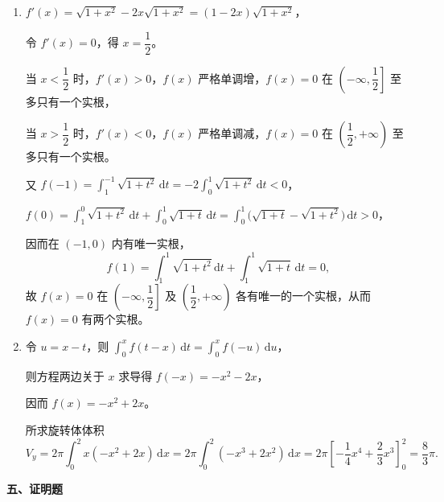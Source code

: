 \documentclass[a4paper,11pt]{ctexart}
\newcommand{\dd}{\,\mathrm{d}}
\begin{document}
\begin{enumerate}[label=\arabic*., start=17, leftmargin=2em, itemsep=0.9em, topsep=0.5em]
  \item $f'(x)=\sqrt{1+x^2}-2x\sqrt{1+x^2}=(1-2x)\sqrt{1+x^2}$，

  令 $f'(x)=0$，得 $x=\dfrac{1}{2}$。

  当 $x<\dfrac{1}{2}$ 时，$f'(x)>0$，$f(x)$ 严格单调增，$f(x)=0$ 在 $\left(-\infty,\dfrac{1}{2}\right]$ 至多只有一个实根，

  当 $x>\dfrac{1}{2}$ 时，$f'(x)<0$，$f(x)$ 严格单调减，$f(x)=0$ 在 $\left(\dfrac{1}{2},+\infty\right)$ 至多只有一个实根。

  又 $f(-1)=\displaystyle\int_1^{-1}\sqrt{1+t^2}\dd t=-2\int_0^1\sqrt{1+t^2}\dd t<0$，

  $f(0)=\displaystyle\int_1^0\sqrt{1+t^2}\dd t+\int_0^1\sqrt{1+t}\dd t=\int_0^1\bigl(\sqrt{1+t}-\sqrt{1+t^2}\bigr)\dd t>0$，

  因而在 $(-1,0)$ 内有唯一实根，
  \[
    f(1)=\int_1^1\sqrt{1+t^2}\dd t+\int_1^1\sqrt{1+t}\dd t=0,
  \]
  故 $f(x)=0$ 在 $\left(-\infty,\dfrac{1}{2}\right]$ 及 $\left(\dfrac{1}{2},+\infty\right)$ 各有唯一的一个实根，从而 $f(x)=0$ 有两个实根。

  \item 令 $u=x-t$，则 $\displaystyle\int_0^x f(t-x)\dd t=\int_0^x f(-u)\dd u$，

  则方程两边关于 $x$ 求导得 $f(-x)=-x^2-2x$，

  因而 $f(x)=-x^2+2x$。

  所求旋转体体积
  \[
    V_y = 2\pi\int_0^2 x(-x^2+2x)\dd x = 2\pi\int_0^2(-x^3+2x^2)\dd x
    = 2\pi\left[-\frac{1}{4}x^4+\frac{2}{3}x^3\right]_0^2 = \frac{8}{3}\pi.
  \]
\end{enumerate}

\vspace{0.6em}

\textbf{五、证明题}
\end{document}
